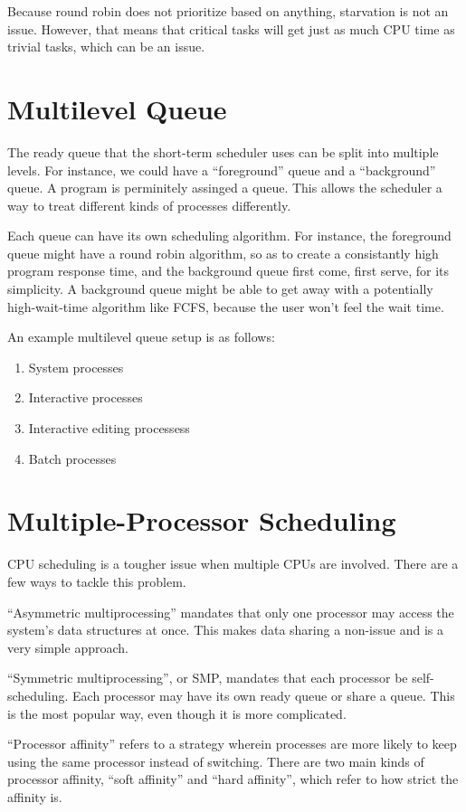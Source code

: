 \documentclass{article}
\begin{document}
Because round robin does not prioritize based on anything, starvation is not an
issue. However, that means that critical tasks will get just as much CPU time
as trivial tasks, which can be an issue.

\section{Multilevel Queue}
The ready queue that the short-term scheduler uses can be split into multiple
levels. For instance, we could have a ``foreground'' queue and a ``background''
queue. A program is perminitely assinged a queue. This allows the scheduler a
way to treat different kinds of processes differently.

Each queue can have its own scheduling algorithm. For instance, the foreground
queue might have a round robin algorithm, so as to create a consistantly high
program response time, and the background queue first come, first serve, for
its simplicity. A background queue might be able to get away with a potentially
high-wait-time algorithm like FCFS, because the user won't feel the wait time.

An example multilevel queue setup is as follows:

\begin{enumerate}
	\item System processes
	\item Interactive processes
	\item Interactive editing processess
	\item Batch processes
\end{enumerate}

\section{Multiple-Processor Scheduling}
CPU scheduling is a tougher issue when multiple CPUs are involved. There are a
few ways to tackle this problem.

``Asymmetric multiprocessing'' mandates that only one processor may access the
system's data structures at once. This makes data sharing a non-issue and is a
very simple approach.

``Symmetric multiprocessing'', or SMP, mandates that each processor be self-
scheduling. Each processor may have its own ready queue or share a queue. This
is the most popular way, even though it is more complicated.

``Processor affinity'' refers to a strategy wherein processes are more likely
to keep using the same processor instead of switching. There are two main kinds
of processor affinity, ``soft affinity'' and ``hard affinity'', which refer to
how strict the affinity is.
\end{document}
